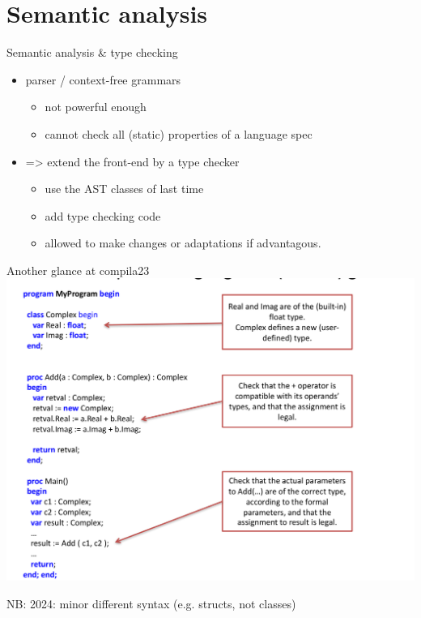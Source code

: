 \documentclass{beamer}
\begin{document}
\section{Semantic analysis}
\label{sec:org2497f86}
\begin{frame}[label={sec:org0464c4f}]{Semantic analysis \& type checking}
\begin{itemize}
\item parser / context-free  grammars 
\begin{itemize}
\item not powerful enough
\item cannot check all (static) properties of a language spec
\end{itemize}

\item => extend the front-end by a type checker

\begin{itemize}
\item use the AST classes of last time
\item add type checking code
\item allowed to make \alert{changes} or adaptations if advantagous.
\end{itemize}
\end{itemize}
\end{frame}
\begin{frame}[label={sec:org6539703}]{Another glance at compila23}
\includegraphics[width=\textwidth]{figures/snaps/compilaexample-checking}


NB: 2024: minor different syntax (e.g. structs, not classes)
\end{frame}
\end{document}
